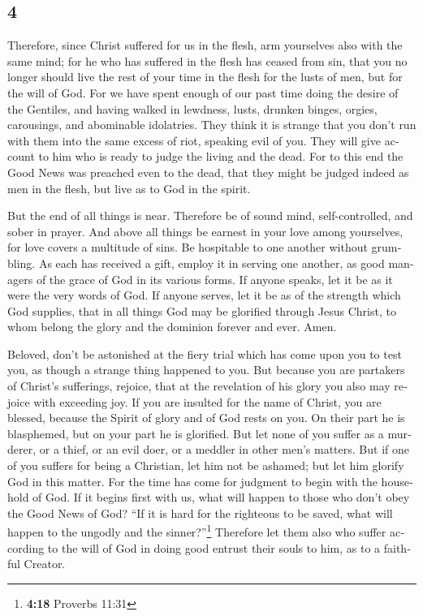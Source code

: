 \begin{paracol}{2}
\switchcolumn
\begin{otherlanguage}{english}

\hypertarget{section-7}{%
\section{4}\label{section-7}}

 Therefore, since Christ suffered for us in the flesh, arm
yourselves also with the same mind; for he who has suffered in the flesh
has ceased from sin,  that you no longer should live the
rest of your time in the flesh for the lusts of men, but for the will of
God.  For we have spent enough of our past time doing the
desire of the Gentiles, and having walked in lewdness, lusts, drunken
binges, orgies, carousings, and abominable idolatries. 
They think it is strange that you don't run with them into the same
excess of riot, speaking evil of you.  They will give
account to him who is ready to judge the living and the dead.
 For to this end the Good News was preached even to the
dead, that they might be judged indeed as men in the flesh, but live as
to God in the spirit.

 But the end of all things is near. Therefore be of sound
mind, self-controlled, and sober in prayer.  And above all
things be earnest in your love among yourselves, for love covers a
multitude of sins.  Be hospitable to one another without
grumbling.  As each has received a gift, employ it in
serving one another, as good managers of the grace of God in its various
forms.  If anyone speaks, let it be as it were the very
words of God. If anyone serves, let it be as of the strength which God
supplies, that in all things God may be glorified through Jesus Christ,
to whom belong the glory and the dominion forever and ever. Amen.

 Beloved, don't be astonished at the fiery trial which
has come upon you to test you, as though a strange thing happened to
you.  But because you are partakers of Christ's
sufferings, rejoice, that at the revelation of his glory you also may
rejoice with exceeding joy.  If you are insulted for the
name of Christ, you are blessed, because the Spirit of glory and of God
rests on you. On their part he is blasphemed, but on your part he is
glorified.  But let none of you suffer as a murderer, or
a thief, or an evil doer, or a meddler in other men's matters.
 But if one of you suffers for being a Christian, let him
not be ashamed; but let him glorify God in this matter. 
For the time has come for judgment to begin with the household of God.
If it begins first with us, what will happen to those who don't obey the
Good News of God?  ``If it is hard for the righteous to
be saved, what will happen to the ungodly and the sinner?''\footnote{\textbf{4:18}
  Proverbs 11:31}  Therefore let them also who suffer
according to the will of God in doing good entrust their souls to him,
as to a faithful Creator.


\end{otherlanguage}
\end{paracol}
